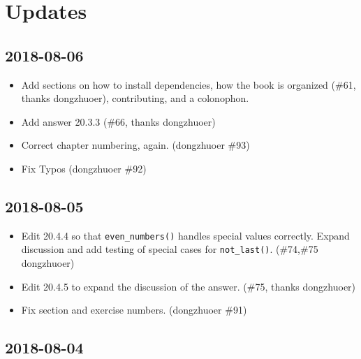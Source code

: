 \documentclass[]{book}
\providecommand{\tightlist}{%
  \setlength{\itemsep}{0pt}\setlength{\parskip}{0pt}}
\theoremstyle{plain}
\theoremstyle{remark}
\theoremstyle{definition}
\theoremstyle{definition}
\theoremstyle{definition}
\theoremstyle{remark}
\begin{document}
\hypertarget{updates}{%
\section*{Updates}\label{updates}}

\hypertarget{section}{%
\subsection*{2018-08-06}\label{section}}

\begin{itemize}
\tightlist
\item
  Add sections on how to install dependencies, how the book is organized
  (\#61, thanks dongzhuoer), contributing, and a colonophon.
\item
  Add answer 20.3.3 (\#66, thanks dongzhuoer)
\item
  Correct chapter numbering, again. (dongzhuoer \#93)
\item
  Fix Typos (dongzhuoer \#92)
\end{itemize}

\hypertarget{section-1}{%
\subsection*{2018-08-05}\label{section-1}}

\begin{itemize}
\item
  Edit 20.4.4 so that \texttt{even\_numbers()} handles special values
  correctly. Expand discussion and add testing of special cases for
  \texttt{not\_last()}. (\#74,\#75 dongzhuoer)
\item
  Edit 20.4.5 to expand the discussion of the answer. (\#75, thanks
  dongzhuoer)
\item
  Fix section and exercise numbers. (dongzhuoer \#91)
\end{itemize}

\hypertarget{section-2}{%
\subsection*{2018-08-04}\label{section-2}}
\end{document}
